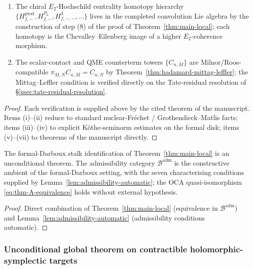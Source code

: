 \begin{lem}
\begin{enumerate}[label=\textup{(\roman*)}]
        Grothendieck--Matlis dual, and the higher-arity kernels
        \(K_n\) are iterated residues on nested diagonals.
  \item The chiral \(E_2\)-Hochschild centrality homotopy hierarchy
        \(\{H^{\mathrm{prod}}_{f,-},H^{P_0}_{f,-},H^3_{f,-,-},\ldots\}\)
        lives in the completed convolution Lie algebra by the
        construction of step (8) of the proof of
        Theorem~\ref{thm:main-local}; each homotopy is the
        Chevalley--Eilenberg image of a higher \(E_2\)-coherence
        morphism.
  \item The scalar-contact and QME counterterm towers
        \(\{C_{n,M}\}\) are Milnor/Roos-compatible
        \(\pi_{M,N}C_{n,M}=C_{n,N}\) by
        Theorem~\ref{thm:hadamard-mittag-leffler}; the
        Mittag--Leffler condition is verified directly on the
        Tate-residual resolution of \S\ref{ssec:tate-residual-resolution}.
\end{enumerate}
\end{lem}

\begin{proof}
Each verification is supplied above by the cited theorem of the
manuscript.  Items (i)--(ii) reduce to standard nuclear-Fréchet /
Grothendieck--Matlis facts; items (iii)--(iv) to explicit
Köthe-seminorm estimates on the formal disk; items (v)--(vii) to
theorems of the manuscript directly.
\end{proof}

\begin{cor}
\label{cor:unconditional-local-deligne}
The formal-Darboux stalk identification of
Theorem~\ref{thm:main-local} is an unconditional theorem.  The
admissibility category \(\mathcal B^{\mathrm{adm}}\) is the
constructive ambient of the formal-Darboux setting, with the seven
characterising conditions supplied by
Lemma~\ref{lem:admissibility-automatic}; the OCA quasi-isomorphism
\eqref{eq:thm-A-equivalence} holds without external hypothesis.
\end{cor}

\begin{proof}
Direct combination of Theorem~\ref{thm:main-local} (equivalence in
\(\mathcal B^{\mathrm{adm}}\)) and
Lemma~\ref{lem:admissibility-automatic} (admissibility conditions
automatic).
\end{proof}

\subsubsection{Unconditional global theorem on contractible
holomorphic-symplectic targets}
\label{sssec:unconditional-global-contractible}

